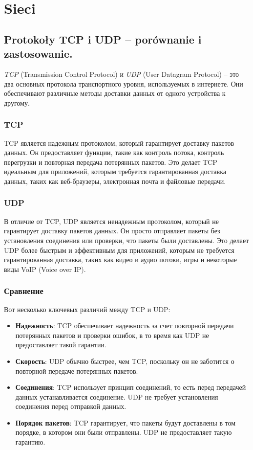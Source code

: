 \chapter{Sieci}
\section{Protokoły TCP i UDP – porównanie i zastosowanie.}


\textit{TCP} (Transmission Control Protocol) и \textit{UDP} (User Datagram Protocol) – это два основных протокола транспортного уровня, используемых в интернете. Они обеспечивают различные методы доставки данных от одного устройства к другому.

\subsection{TCP}

TCP является надежным протоколом, который гарантирует доставку пакетов данных. Он предоставляет функции, такие как контроль потока, контроль перегрузки и повторная передача потерянных пакетов. Это делает TCP идеальным для приложений, которым требуется гарантированная доставка данных, таких как веб-браузеры, электронная почта и файловые передачи.

\subsection{UDP}

В отличие от TCP, UDP является ненадежным протоколом, который не гарантирует доставку пакетов данных. Он просто отправляет пакеты без установления соединения или проверки, что пакеты были доставлены. Это делает UDP более быстрым и эффективным для приложений, которым не требуется гарантированная доставка, таких как видео и аудио потоки, игры и некоторые виды VoIP (Voice over IP).

\subsection{Сравнение}

Вот несколько ключевых различий между TCP и UDP:

\begin{itemize}
\item \textbf{Надежность}: TCP обеспечивает надежность за счет повторной передачи потерянных пакетов и проверки ошибок, в то время как UDP не предоставляет такой гарантии.
\item \textbf{Скорость}: UDP обычно быстрее, чем TCP, поскольку он не заботится о повторной передаче потерянных пакетов.
\item \textbf{Соединения}: TCP использует принцип соединений, то есть перед передачей данных устанавливается соединение. UDP не требует установления соединения перед отправкой данных.
\item \textbf{Порядок пакетов}: TCP гарантирует, что пакеты будут доставлены в том порядке, в котором они были отправлены. UDP не предоставляет такую гарантию.
\end{itemize}

